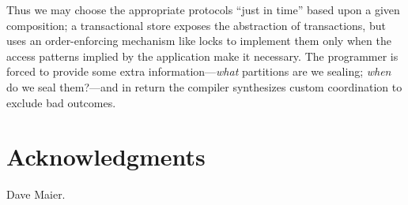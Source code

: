 \documentclass{sig-alternate}
\begin{document}
Thus we may choose the appropriate protocols ``just in time'' based upon a given composition; a transactional store exposes the abstraction of transactions, but uses an order-enforcing mechanism like locks to implement them only when the access patterns implied by the application make it necessary. The programmer is forced to provide some extra information---\emph{what} partitions are we sealing; \emph{when} do we seal them?---and in return the compiler synthesizes custom coordination to exclude bad outcomes.  




\section{Acknowledgments}
Dave Maier.



\end{document}
